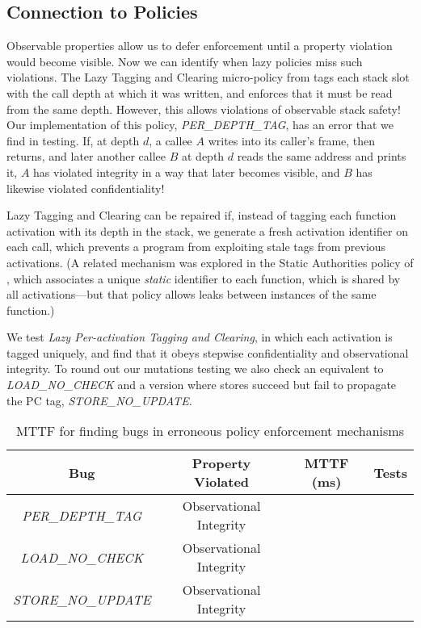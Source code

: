 \documentclass[acmsmall,review,anonymous]{acmart}\settopmatter{printfolios=true,printccs=false,printacmref=false}
\begin{document}
{\subsection{Connection to Policies}

Observable properties allow us to defer enforcement until a property
violation would become visible. Now we can identify when lazy policies
miss such violations. The Lazy Tagging and Clearing
micro-policy from \citet{DBLP:conf/sp/RoesslerD18} tags each stack slot with the call depth
at which it was written, and enforces that it must be read from the
same depth. However, this allows violations of observable stack safety!
Our implementation of this policy, {\em PER\_DEPTH\_TAG}, has an error that we find
in testing. If, at depth \(d\), a callee \(A\) writes into its caller's
frame, then returns, and later another callee \(B\) at depth \(d\) reads the same
address and prints it, \(A\) has violated integrity in a way that later becomes visible,
and \(B\) has likewise violated confidentiality!

Lazy Tagging and Clearing can be repaired if, instead of tagging each function
activation with its depth in the stack, we generate a fresh activation
identifier on each call, which prevents a program from exploiting stale
tags from previous activations.
(A related mechanism was explored in the
Static Authorities policy of \citet{DBLP:conf/sp/RoesslerD18}, which
associates a unique \emph{static} identifier to each function, which is shared
by all activations---but that policy allows leaks between
instances of the same function.)

We test {\em Lazy Per-activation Tagging and Clearing}, in which
each activation is tagged uniquely, and find that it obeys stepwise
confidentiality and observational integrity. To round out our mutations testing
we also check an equivalent to {\em LOAD\_NO\_CHECK} and a version where
stores succeed but fail to propagate the PC tag, {\em STORE\_NO\_UPDATE}.

\begin{table}[]
\centering
\begin{tabular}{c|c|c|c}
        Bug & Property Violated & MTTF (ms) & Tests \\
  \hline
        {\em PER\_DEPTH\_TAG} & Observational Integrity &  & \\
        {\em LOAD\_NO\_CHECK}  & Observational Integrity &  & \\
        {\em STORE\_NO\_UPDATE} & Observational Integrity &  & \\
\end{tabular}
\vspace*{1em}
\caption{MTTF for finding bugs in erroneous policy enforcement mechanisms}
\vspace*{-2em}
\label{tab:lazy-bug-table}
\end{table}


}
\end{document}
